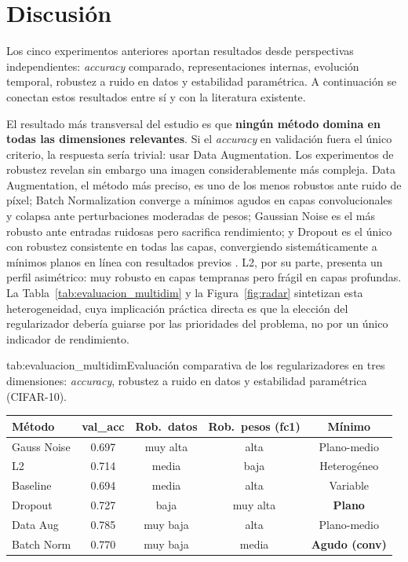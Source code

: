 \section{Discusión\label{CAP:discusion}}

Los cinco experimentos anteriores aportan resultados desde perspectivas independientes:
\textit{accuracy} comparado, representaciones internas, evolución temporal, robustez
a ruido en datos y estabilidad paramétrica. A continuación se conectan estos resultados
entre sí y con la literatura existente.

El resultado más transversal del estudio es que \textbf{ningún método domina en todas
las dimensiones relevantes}. Si el \textit{accuracy} en validación fuera el único
criterio, la respuesta sería trivial: usar Data Augmentation. Los experimentos de
robustez revelan sin embargo una imagen considerablemente más compleja. Data Augmentation,
el método más preciso, es uno de los menos robustos ante ruido de píxel; Batch
Normalization converge a mínimos agudos en capas convolucionales y colapsa ante
perturbaciones moderadas de pesos; Gaussian Noise es el más robusto ante entradas
ruidosas pero sacrifica rendimiento; y Dropout es el único con robustez consistente
en todas las capas, convergiendo sistemáticamente a mínimos planos en línea con
resultados previos \cite{hochreiter1997flat,keskar2017large,wan2013regularization,gal2016dropout}.
L2, por su parte, presenta un perfil asimétrico: muy robusto en capas tempranas pero
frágil en capas profundas. La Tabla~\ref{tab:evaluacion_multidim} y la
Figura~\ref{fig:radar} sintetizan esta heterogeneidad, cuya implicación práctica directa
es que la elección del regularizador debería guiarse por las prioridades del problema,
no por un único indicador de rendimiento.

\begin{table}{tab:evaluacion_multidim}{Evaluación comparativa de los regularizadores en tres dimensiones:
\textit{accuracy}, robustez a ruido en datos y estabilidad paramétrica (CIFAR-10).}
\small
\begin{tabular}{lcccc}
\toprule
\textbf{Método} & \textbf{val\_acc} & \textbf{Rob.~datos} & \textbf{Rob.~pesos (fc1)} & \textbf{Mínimo} \\
\midrule
Gauss Noise & 0.697 & muy alta  & alta       & Plano-medio \\
L2          & 0.714 & media     & baja       & Heterogéneo \\
Baseline    & 0.694 & media     & alta       & Variable    \\
Dropout     & 0.727 & baja      & muy alta   & \textbf{Plano} \\
Data Aug    & 0.785 & muy baja  & alta       & Plano-medio \\
Batch Norm  & 0.770 & muy baja  & media      & \textbf{Agudo (conv)} \\
\bottomrule
\end{tabular}
\end{table}


